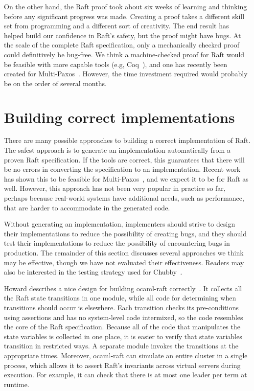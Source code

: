 On the other hand, the Raft proof took about six weeks  of learning
and thinking before any significant progress was made. Creating a proof
takes a different skill set from programming and a different sort of
creativity. The end result has helped build our confidence in Raft's
safety, but the proof might have bugs. At the scale of the complete Raft
specification, only a mechanically checked proof could definitively be
bug-free. We think a machine-checked proof for Raft would be feasible
with more capable tools (e.g, Coq~\cite{Bertot:2004}), and one has
recently been created for Multi-Paxos~\cite{Schiper:2014}. However, the
time investment required would probably be on the order of several
months.

\section{Building correct implementations}
\label{correctness:testing}

There are many possible approaches to building a correct implementation
of Raft. The safest approach is to generate an implementation
automatically from a proven Raft specification. If the tools are
correct, this guarantees that there will be no errors in converting the
specification to an implementation. Recent work has shown this to be
feasible for Multi-Paxos~\cite{Schiper:2014}, and we expect it to be for
Raft as well. However, this approach has not been very popular in
practice so far, perhaps because real-world systems have additional
needs, such as performance, that are harder to accommodate in the
generated code.

Without generating an implementation, implementers should strive to
design their implementations to reduce the possibility of creating bugs,
and they should test their implementations to reduce the possibility of
encountering bugs in production. The remainder of this section discusses
several approaches we think may be effective, though we have not
evaluated their effectiveness. Readers may also be interested in the
testing strategy used for Chubby~\cite{Chandra:2007}.

Howard describes a nice design for building ocaml-raft
correctly~\cite{Howard:2014,impl:ocaml-raft}. It collects all the Raft
state transitions in one module, while all code for determining when
transitions should occur is elsewhere. Each transition checks its
pre-conditions using assertions and has no system-level code
intermixed, so the code resembles the core of the Raft specification.
Because all of the code that manipulates the state variables is
collected in one place, it is easier to verify that state variables
transition in restricted ways. A separate module invokes the transitions
at the appropriate times.
Moreover, ocaml-raft can simulate an
entire cluster in a single process, which allows it to assert Raft's
invariants across virtual servers during execution. For example, it can
check that there is at most one leader per term at runtime. 

